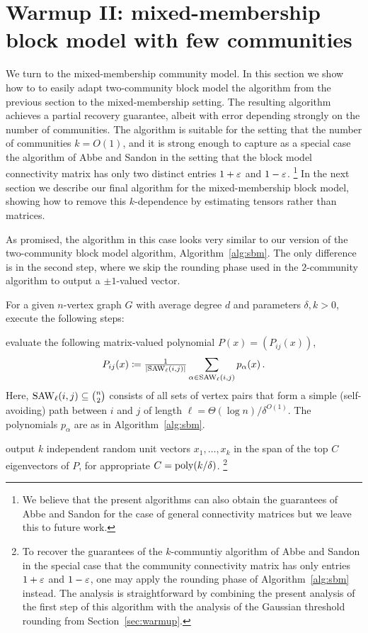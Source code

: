 \iffalse
\section{Warmup II: mixed-membership block model with few communities}
\Dnote{}
\label{sec:mm-warmup}
We turn to the mixed-membership community model.
In this section we show how to to easily adapt two-community block model the algorithm from the previous section to the mixed-membership setting.
The resulting algorithm achieves a partial recovery guarantee, albeit with error depending strongly on the number of communities.
The algorithm is suitable for the setting that the number of communities $k = O(1)$, and it is strong enough to capture as a special case the algorithm of Abbe and Sandon \cite{DBLP:conf/nips/AbbeS16} in the setting that the block model connectivity matrix has only two distinct entries $1 + \varepsilon$ and $1 - \varepsilon$.
\footnote{We believe that the present algorithms can also obtain the guarantees of Abbe and Sandon for the case of general connectivity matrices but we leave this to future work.}
In the next section we describe our final algorithm for the mixed-membership block model, showing how to remove this $k$-dependence by estimating tensors rather than matrices.


As promised, the algorithm in this case looks very similar to our version of the two-community block model algorithm, Algorithm~\ref{alg:sbm}.
The only difference is in the second step, where we skip the rounding phase used in the $2$-community algorithm to output a $\pm 1$-valued vector.
\begin{algorithm}
  \label{alg:mm-warmup}
  For a given $n$-vertex graph $G$ with average degree $d$ and parameters $\delta,k > 0$, execute the following steps:
 \begin{compactenum}
  \item  evaluate the following matrix-valued polynomial $P(x) = (P_{ij}(x))$,
  \[
    P_{ij}(x)
    \coloneq \tfrac 1 {\lvert\mathrm{SAW}_\ell(i,j)\rvert}
    \sum_{\alpha\in \mathrm{SAW}_\ell(i,j)} p_\alpha(x)\,.
  \]
  Here, $\mathrm{SAW}_\ell(i,j) \subseteq \binom n 2 $ consists of all sets of vertex pairs that form a simple (self-avoiding) path between $i$ and $j$ of length $\ell=\Theta(\log n) / \delta^{O(1)}$.
  The polynomials $p_\alpha$ are as in Algorithm~\ref{alg:sbm}.
  \item output $k$ independent random unit vectors $x_1,\ldots,x_k$ in the span of the top $C$ eigenvectors of $P$, for appropriate $C = \operatorname{poly}(k/\delta)$.
  \footnote{To recover the guarantees of the $k$-communtiy algorithm of Abbe and Sandon \cite{DBLP:conf/nips/AbbeS16} in the special case that the community connectivity matrix has only entries $1 + \varepsilon$ and $1-\varepsilon$, one may apply the rounding phase of Algorithm~\ref{alg:sbm} instead.
  The analysis is straightforward by combining the present analysis of the first step of this algorithm with the analysis of the Gaussian threshold rounding from Section~\ref{sec:warmup}.}
  \end{compactenum}
\end{algorithm}


